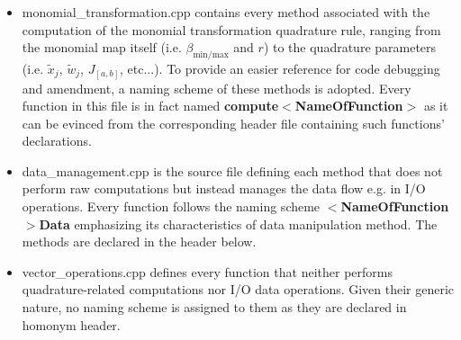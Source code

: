 \documentclass[a4paper, twosided]{book}
\begin{document}
\begin{itemize}
    \item \colorbox{poliGrayBlue}{monomial\_transformation.cpp} contains every method associated with the computation of the monomial transformation quadrature rule, ranging from the monomial map itself (i.e. $\beta_{\text{min/max}}$ and $r$) to the quadrature parameters (i.e. $\tilde{x}_j$, $\tilde{w}_j$, $J_{[a,b]}$, etc...). To provide an easier reference for code debugging and amendment, a naming scheme of these methods is adopted. Every function in this file is in fact named \color{poliDarkBlue} \textbf{compute}$\boldsymbol{<}$\textbf{NameOfFunction$\boldsymbol{>}$} \color{black} as it can be evinced from the corresponding header file containing such functions' declarations.
    
    \vspace{0.2cm}
    
    \item \colorbox{poliGrayBlue}{data\_management.cpp} is the source file defining each method that does not perform raw computations but instead manages the data flow e.g. in I/O operations. Every function follows the naming scheme \color{poliDarkBlue} $\boldsymbol{<}$\textbf{NameOfFunction$\boldsymbol{>}$}\textbf{Data} \color{black} emphasizing its characteristics of data manipulation method. The methods are declared in the header below.

    \newpage
    \vspace{0.2cm}
    \vspace{0.3cm}
    
    \item \colorbox{poliGrayBlue}{vector\_operations.cpp} defines every function that neither performs quadrature-related computations nor I/O data operations. Given their generic nature, no naming scheme is assigned to them as they are declared in homonym header.
    
    \vspace{0.15cm}
\end{itemize}
\end{document}
